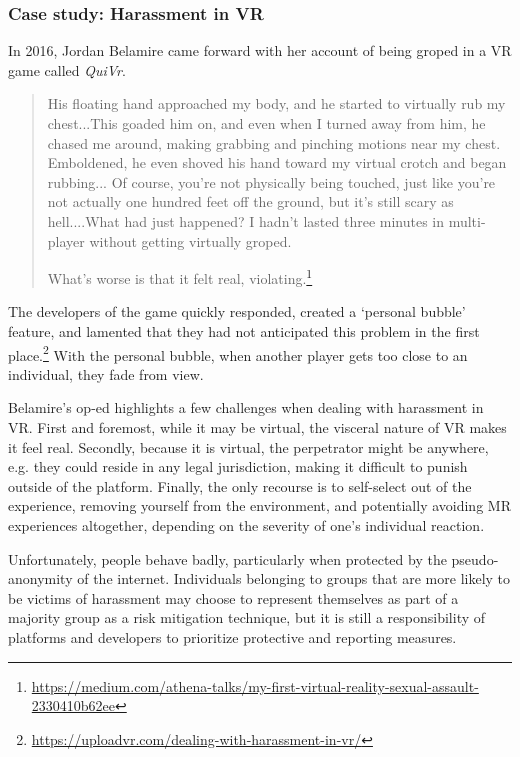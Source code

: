 
\subsubsection{Case study: Harassment in VR}
In 2016, Jordan Belamire came forward with her account of being groped in a VR game called \emph{QuiVr}.

\begin{quote}
His floating hand approached my body, and he started to virtually rub my chest...This goaded him on, and even when I turned away from him, he chased me around, making grabbing and pinching motions near my chest. Emboldened, he even shoved his hand toward my virtual crotch and began rubbing... Of course, you’re not physically being touched, just like you’re not actually one hundred feet off the ground, but it’s still scary as hell....What had just happened? I hadn’t lasted three minutes in multi-player without getting virtually groped. 

What’s worse is that it felt real, violating.\footnote{\url{https://medium.com/athena-talks/my-first-virtual-reality-sexual-assault-2330410b62ee}}
\end{quote}

The developers of the game quickly responded, created a `personal bubble' feature, and lamented that they had not anticipated this problem in the first place.\footnote{\url{https://uploadvr.com/dealing-with-harassment-in-vr/}} With the personal bubble, when another player gets too close to an individual, they fade from view.

Belamire's op-ed highlights a few challenges when dealing with harassment in VR. First and foremost, while it may be virtual, the visceral nature of VR makes it feel real. Secondly, because it is virtual, the perpetrator might be anywhere, e.g. they could reside in any legal jurisdiction, making it difficult to punish outside of the platform. Finally, the only recourse is to self-select out of the experience, removing yourself from the environment, and potentially avoiding MR experiences altogether, depending on the severity of one's individual reaction.

Unfortunately, people behave badly, particularly when protected by the pseudo-anonymity of the internet. Individuals belonging to groups that are more likely to be victims of harassment may choose to represent themselves as part of a majority group as a risk mitigation technique, but it is still a responsibility of platforms and developers to prioritize protective and reporting measures.


